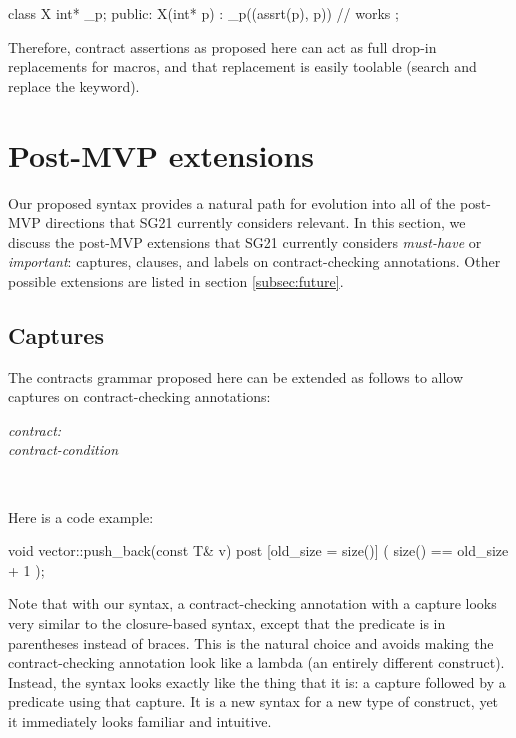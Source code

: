 \begin{codeblock}
class X {
  int* _p;
public:
  X(int* p) : _p((assrt(p), p)) {}  // works
};
\end{codeblock} 

Therefore, contract assertions as proposed here can act as full drop-in replacements for  macros, and that replacement is easily toolable (search and replace the keyword).

\section{Post-MVP extensions}

Our proposed syntax provides a natural path for evolution into all of the post-MVP directions that SG21 currently considers relevant. In this section, we discuss the post-MVP extensions that SG21 currently considers \emph{must-have} or \emph{important}:  captures,  clauses, and labels on contract-checking annotations. Other possible extensions are listed in section \ref{subsec:future}.

\subsection{Captures}
\label{subsec:captures}

The contracts grammar proposed here can be extended as follows to allow captures on contract-checking annotations:

\begin{adjustwidth}{0.5cm}{0.5cm}

\emph{contract:} \\
\phantom{~~~} \emph{contract-condition}

 \\
\phantom{~~~}

\end{adjustwidth}

Here is a code example:

\begin{codeblock}
void vector::push_back(const T& v)
  post [old_size = size()] ( size() == old_size + 1 );
\end{codeblock}

Note that with our syntax, a contract-checking annotation with a capture looks very similar to the closure-based syntax, except that the predicate is in parentheses instead of braces. This is the natural choice and avoids making the contract-checking annotation look like a lambda (an entirely different construct). Instead, the syntax looks exactly like the thing that it is: a capture followed by a predicate using that capture. It is a new syntax for a new type of construct, yet it immediately looks familiar and intuitive.


